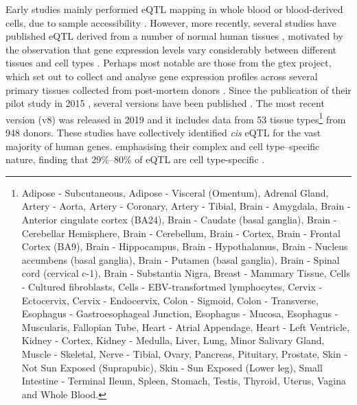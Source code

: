 Early studies mainly performed eQTL mapping in whole blood or blood-derived cells, due to sample accessibility \cite{stranger2007population, pickrell2010understanding}.
However, more recently, several studies have published eQTL derived from a number of normal human tissues \cite{myers2007survey, zhong2010liver,fu2012unraveling, nica2011architecture, dimas2009common, fairfax2012genetics, stranger2012patterns, schadt2008mapping, hao2012lung, innocenti2011identification}, motivated by the observation that gene expression levels vary considerably between different tissues and cell types \cite{su2002large}.
Perhaps most notable are those from the \gls{gtex} project, which set out to collect and analyse gene expression profiles across several primary tissues collected from post-mortem donors \cite{lonsdale2013genotype}.
Since the publication of their pilot study in 2015 \cite{gtex2015genotype}, several versions have been published \cite{gtex2017genetic, aguet2019gtex}.
The most recent version (v8) was released in 2019 and it includes data from 53 tissue types\footnote{Adipose - Subcutaneous, Adipose - Visceral (Omentum), Adrenal Gland, Artery - Aorta, Artery - Coronary, Artery - Tibial, 
Brain - Amygdala, Brain - Anterior cingulate cortex (BA24), Brain - Caudate (basal ganglia), Brain - Cerebellar Hemisphere, Brain - Cerebellum, Brain - Cortex, Brain - Frontal Cortex (BA9), Brain - Hippocampus, Brain - Hypothalamus, Brain - Nucleus accumbens (basal ganglia), Brain - Putamen (basal ganglia), Brain - Spinal cord (cervical c-1), Brain - Substantia Nigra, 
Breast - Mammary Tissue, Cells - Cultured fibroblasts, Cells - EBV-transfortmed lymphocytes,  Cervix - Ectocervix, Cervix - Endocervix, Colon - Sigmoid, Colon - Transverse, Esophagus - Gastroesophageal Junction, Esophagus - Mucosa, Esophagus - Muscularis, Fallopian Tube, Heart - Atrial Appendage, Heart - Left Ventricle, Kidney - Cortex, Kidney - Medulla, Liver, Lung,  Minor Salivary Gland, Muscle - Skeletal, Nerve - Tibial, Ovary, Pancreas, Pituitary, Prostate, Skin - Not Sun Exposed (Suprapubic), Skin - Sun Exposed (Lower leg), Small Intestine - Terminal Ileum, Spleen, Stomach, Testis, Thyroid, Uterus, Vagina and Whole Blood.} from 948 donors.
These studies have collectively identified \textit{cis} eQTL for the vast majority of human genes.
emphasising their complex and cell type–specific nature, finding that 29\%–80\% of eQTL are cell type-specific \cite{gtex2015genotype, nica2011architecture, dimas2009common,  fairfax2012genetics}. \\


